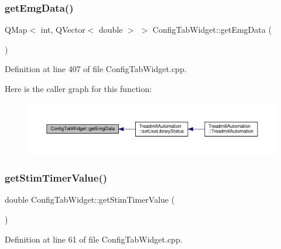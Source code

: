 \subsubsection{\texorpdfstring{get\+Emg\+Data()}{getEmgData()}}
{\footnotesize\ttfamily Q\+Map$<$ int, Q\+Vector$<$ double $>$ $>$ Config\+Tab\+Widget\+::get\+Emg\+Data (\begin{DoxyParamCaption}{ }\end{DoxyParamCaption})}



Definition at line 407 of file Config\+Tab\+Widget.\+cpp.

Here is the caller graph for this function\+:
\nopagebreak
\begin{figure}[H]
\begin{center}
\leavevmode
\includegraphics[width=350pt]{class_config_tab_widget_aca7e549d4ae9cc7de010fc6ffd7e9265_icgraph}
\end{center}
\end{figure}
\mbox{\label{class_config_tab_widget_a783fb40a272c4a2fb3053da07955db0d}} 
\subsubsection{\texorpdfstring{get\+Stim\+Timer\+Value()}{getStimTimerValue()}}
{\footnotesize\ttfamily double Config\+Tab\+Widget\+::get\+Stim\+Timer\+Value (\begin{DoxyParamCaption}{ }\end{DoxyParamCaption})}



Definition at line 61 of file Config\+Tab\+Widget.\+cpp.


